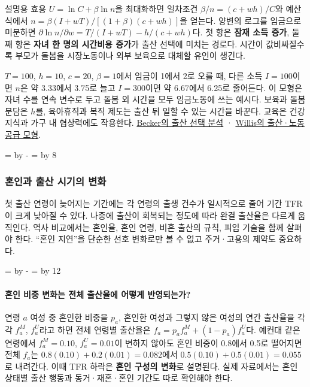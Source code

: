 \documentclass[10pt,a4paper]{article}
\newcommand{\ReserveQuestionSpace}{%
  \par\begingroup
  \dimen0=\pagegoal \advance\dimen0 by -\pagetotal
  \dimen2=\baselineskip \multiply\dimen2 by 12
  \ifdim\dimen0<\dimen2 \newpage\fi
  \endgroup}
\newcommand{\ReserveReadingSectionSpace}{%
  \par\begingroup
  \dimen0=\pagegoal \advance\dimen0 by -\pagetotal
  \dimen2=\baselineskip \multiply\dimen2 by 8
  \ifdim\dimen0<\dimen2 \newpage\fi
  \endgroup}
\begin{document}
설명용 효용 $U=\ln C+\beta\ln n$을 최대화하면 일차조건 $\beta/n=(c+wh)/C$와 예산식에서 $n=\beta(I+wT)/[(1+\beta)(c+wh)]$을 얻는다. 양변의 로그를 임금으로 미분하면 $\partial\ln n/\partial w=T/(I+wT)-h/(c+wh)$다. 첫 항은 \textbf{잠재 소득 증가}, 둘째 항은 \textbf{자녀 한 명의 시간비용 증가}가 출산 선택에 미치는 경로다. 시간이 값비싸질수록 부모가 돌봄을 시장노동이나 외부 보육으로 대체할 유인이 생긴다.\par

$T=100$, $h=10$, $c=20$, $\beta=1$에서 임금이 1에서 2로 오를 때, 다른 소득 $I=100$이면 $n$은 약 3.33에서 3.75로 늘고 $I=300$이면 약 6.67에서 6.25로 줄어든다. 이 모형은 자녀 수를 연속 변수로 두고 돌봄 외 시간을 모두 임금노동에 쓰는 예시다. 보육과 돌봄 분담은 $h$를, 육아휴직과 복직 제도는 출산 뒤 일할 수 있는 시간을 바꾼다. 교육은 건강 지식과 가구 내 협상력에도 작용한다. \href{https://www.nber.org/books-and-chapters/demographic-and-economic-change-developed-countries/economic-analysis-fertility}{Becker의 출산 선택 분석} · \href{https://www.journals.uchicago.edu/doi/10.1086/260152}{Willis의 출산·노동공급 모형}.\par

\ReserveReadingSectionSpace
\subsubsection*{혼인과 출산 시기의 변화}

첫 출산 연령이 늦어지는 기간에는 각 연령의 출생 건수가 일시적으로 줄어 기간 TFR이 크게 낮아질 수 있다. 나중에 출산이 회복되는 정도에 따라 완결 출산율은 다르게 움직인다. 역사 비교에서는 혼인율, 혼인 연령, 비혼 출산의 규칙, 피임 기술을 함께 살펴야 한다. “혼인 지연”을 단순한 선호 변화로만 볼 수 없고 주거·고용의 제약도 중요하다.\par

\ReserveQuestionSpace
\paragraph{혼인 비중 변화는 전체 출산율에 어떻게 반영되는가?}
연령 $a$ 여성 중 혼인한 비중을 $p_a$, 혼인한 여성과 그렇지 않은 여성의 연간 출산율을 각각 $f_a^M$, $f_a^U$라고 하면 전체 연령별 출산율은 $f_a=p_af_a^M+(1-p_a)f_a^U$다. 예컨대 같은 연령에서 $f_a^M=0.10$, $f_a^U=0.01$이 변하지 않아도 혼인 비중이 0.8에서 0.5로 떨어지면 전체 $f_a$는 $0.8(0.10)+0.2(0.01)=0.082$에서 $0.5(0.10)+0.5(0.01)=0.055$로 내려간다. 이때 TFR 하락은 \textbf{혼인 구성의 변화}로 설명된다. 실제 자료에서는 혼인 상태별 출산 행동과 동거·재혼·혼인 기간도 따로 확인해야 한다.\par
\end{document}
